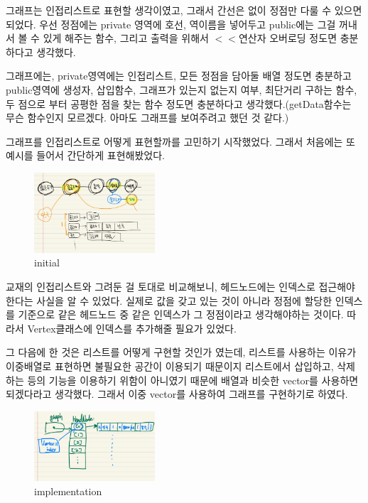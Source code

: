 \documentclass[a4paper,11pt]{article}
\begin{document}
그래프는 인접리스트로 표현할 생각이였고, 그래서 간선은 없이 정점만 다룰 수 있으면 되었다. 우선 정점에는 private 영역에 호선, 역이름을 넣어두고 public에는 그걸 꺼내서 볼 수 있게 해주는 함수, 그리고 출력을 위해서 $<<$연산자 오버로딩 정도면 충분하다고 생각했다. 

그래프에는, private영역에는 인접리스트, 모든 정점을 담아둘 배열 정도면 충분하고 public영역에 생성자, 삽입함수, 그래프가 있는지 없는지 여부, 최단거리 구하는 함수, 두 점으로 부터 공평한 점을 찾는 함수 정도면 충분하다고 생각했다.(getData함수는 무슨 함수인지 모르겠다. 아마도 그래프를 보여주려고 했던 것 같다.) 

그래프를 인접리스트로 어떻게 표현할까를 고민하기 시작했었다. 그래서 처음에는 또 예시를 들어서 간단하게 표현해봤었다.

\begin{figure}[!h]
\begin{center}
\includegraphics[width=0.4\textwidth]{expressWithList}
\caption{initial}
\label{fig:fig4}
\end{center}
\end{figure}


교재의 인접리스트와 그려둔 걸 토대로 비교해보니, 헤드노드에는 인덱스로 접근해야한다는 사실을 알 수 있었다. 실제로 값을 갖고 있는 것이 아니라 정점에 할당한 인덱스를 기준으로 같은 헤드노드 중 같은 인덱스가 그 정점이라고 생각해야하는 것이다. 따라서 Vertex클래스에 인덱스를 추가해줄 필요가 있었다. 

그 다음에 한 것은 리스트를 어떻게 구현할 것인가 였는데, 리스트를 사용하는 이유가 이중배열로 표현하면 불필요한 공간이 이용되기 때문이지 리스트에서 삽입하고, 삭제하는 등의 기능을 이용하기 위함이 아니였기 때문에 배열과 비슷한 vector를 사용하면 되겠다라고 생각했다. 그래서 이중 vector를 사용하여 그래프를 구현하기로 하였다.

\begin{figure}[!h]
\begin{center}
\includegraphics[width=0.4\textwidth]{implementationOfList}
\caption{implementation}
\label{fig:fig5}
\end{center}
\end{figure}
\end{document}
